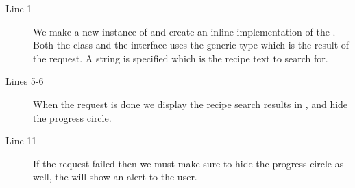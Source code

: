 \begin{description}
\item[Line 1] We make a new instance of  and create an inline implementation of the . Both the class and the interface uses the generic type  which is the result of the request. A  string is specified which is the recipe text to search for.
\item[Lines 5-6] When the request is done we display the recipe search results in , and hide the progress circle.
\item[Line 11] If the request failed then we must make sure to hide the progress circle as well, the  will show an alert to the user.
\end{description}
